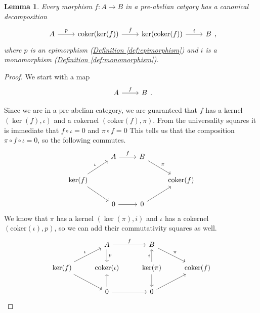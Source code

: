 \documentclass[a4paper]{report}
\newcommand{\coker}{\mathrm{coker}}
\theoremstyle{definition}
\theoremstyle{plain}
\newtheorem{lemma}{Lemma}[section]
\theoremstyle{remark}
\begin{document}
\begin{lemma}
  \label{lemma:everymorphisminapreabeliancategoryfactors}
  Every morphism $f\colon A \to B$ in a pre-abelian catgory has a canonical decomposition
  \begin{equation*}
    \begin{tikzcd}
      A 
      \arrow[r, "p"]
      & \coker(\ker(f))
      \arrow[r, "\bar{f}"]
      & \ker(\coker(f))
      \arrow[r, "i"]
      & B
    \end{tikzcd},
  \end{equation*}
  where $p$ is an epimorphism (\hyperref[def:epimorphism]{Definition \ref*{def:epimorphism}}) and $i$ is a monomorphism (\hyperref[def:monomorphism]{Definition \ref*{def:monomorphism}}).
\end{lemma}
\begin{proof}
  We start with a map
  \begin{equation*}
    \begin{tikzcd}
      A 
      \arrow[r, "f"]
      & B
    \end{tikzcd}.
  \end{equation*}

  Since we are in a pre-abelian category, we are guaranteed that $f$ has a kernel $(\ker(f), \iota)$ and a cokernel $(\coker(f), \pi)$. From the universality squares it is immediate that $f \circ \iota = 0$ and $\pi \circ f = 0$ This tells us that the composition $\pi \circ f \circ \iota = 0$, so the following commutes.
  \begin{equation*}
    \begin{tikzcd}
      & A
      \arrow[r, "f"]
      & B
      \arrow[dr, "\pi"]
      \\
      \ker(f)
      \arrow[ur, "\iota"]
      \arrow[dr]
      & & & \coker(f)
      \\
      & 0
      \arrow[r]
      & 0
      \arrow[ur]
    \end{tikzcd}
  \end{equation*}
  We know that $\pi$ has a kernel $(\ker(\pi), i)$ and $\iota$ has a cokernel $(\coker(\iota), p)$, so we can add their commutativity squares as well.
  \begin{equation*}
    \begin{tikzcd}
      & A
      \arrow[r, "f"]
      \arrow[d, "p"]
      & B
      \arrow[dr, "\pi"]
      \\
      \ker(f)
      \arrow[ur, "\iota"]
      \arrow[dr]
      & \coker(\iota)
      & \ker(\pi)
      \arrow[u, "i"]
      \arrow[d]
      & \coker(f)
      \\
      & 0
      \arrow[u]
      \arrow[r]
      & 0
      \arrow[ur]
    \end{tikzcd}
  \end{equation*}


\end{proof}
\end{document}
